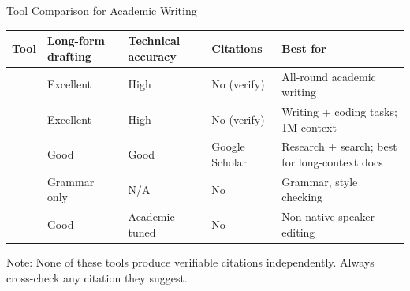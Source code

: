 \begin{frame}{Tool Comparison for Academic Writing}
  \footnotesize
  \begin{tabularx}{\textwidth}{lYYYY}
    \toprule
    \textbf{Tool} & \textbf{Long-form drafting} & \textbf{Technical accuracy} & \textbf{Citations} & \textbf{Best for} \\
    \midrule
     & Excellent & High  & No (verify) & All-round academic writing \\
     & Excellent & High  & No (verify) & Writing + coding tasks; 1M context \\
     & Good      & Good  & Google Scholar & Research + search; best for long-context docs \\
            & Grammar only & N/A & No & Grammar, style checking \\
            & Good      & Academic-tuned & No & Non-native speaker editing \\
    \bottomrule
  \end{tabularx}
  \vspace{0.2em}
  \footnotesize \alert{Note:} None of these tools produce verifiable citations independently. Always cross-check any citation they suggest.
\end{frame}

